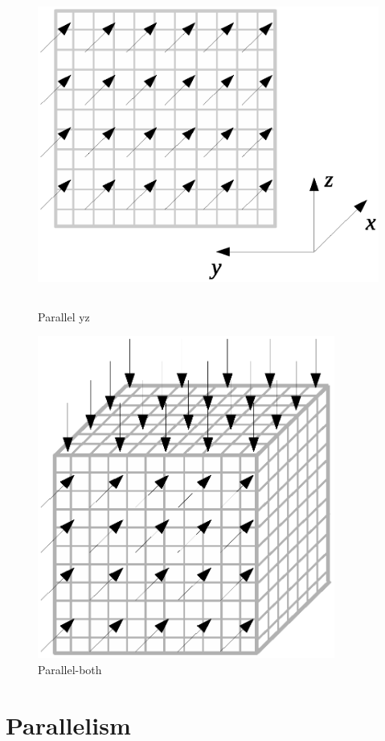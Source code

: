 \documentclass{article}
\begin{document}
\begin{figure}[h]
\begin{center}
\includegraphics[trim={{100pt} {150pt} {100pt} {150pt}}, clip, height=300pt]{img/parallel-yz.eps}
\end{center}
\caption{Parallel yz}
\label{fig:parallel-yz}
\end{figure}




\begin{figure}[h]
\begin{center}
\includegraphics[trim={{100pt} {150pt} {100pt} {150pt}}, clip, height=300pt]{img/parallel-both.eps}
\end{center}
\caption{Parallel-both}
\label{fig:parallel-both}
\end{figure}




\section{Parallelism}


\section{}
\end{document}
